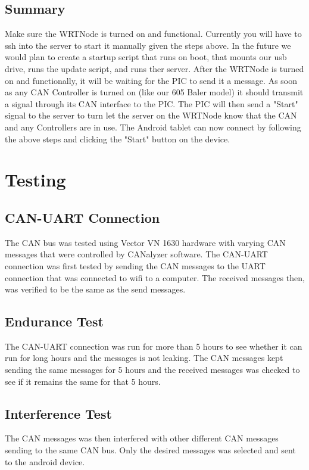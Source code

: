 \documentclass[paper=a4, fontsize=11pt]{scrartcl}
\numberwithin{equation}{section}		%
\numberwithin{figure}{section}			%
\numberwithin{table}{section}				%
\begin{document}
 \subsection{Summary} 
 Make sure the WRTNode is turned on and functional. Currently you will have to ssh into the server to start it manually given the steps above. In the future we would plan to create a startup script that runs on boot, that mounts our usb drive, runs the update script, and runs ther server. After the WRTNode is turned on and functionally, it will be waiting for the PIC to send it a  message. As soon as any CAN Controller is turned on (like our 605 Baler model) it should transmit a signal through its CAN interface to the PIC. The PIC will then send a "Start" signal to the server to turn let the server on the WRTNode know that the CAN and any Controllers are in use. The Android tablet can now connect by following the above steps and clicking the "Start" button on the device. \\


\section{Testing}
\subsection{CAN-UART Connection}
The CAN bus was tested using Vector VN 1630 hardware with varying CAN messages that were  controlled by CANalyzer software. The CAN-UART connection was first tested by sending the CAN messages to the UART connection that was connected to 	wifi to a computer. The received messages then, was verified to be the same as the send messages. \\

\subsection{Endurance Test}
The CAN-UART connection was run for more than 5 hours to see whether it can run for long hours and the messages is not leaking. The CAN messages kept sending the same messages for 5 hours and the received messages was checked to see if it remains the same for that 5 hours. \\

\subsection{Interference Test}
The CAN messages was then interfered with other different CAN messages sending to the same CAN bus. Only the desired messages was selected and sent to the android device. \\
\end{document}
